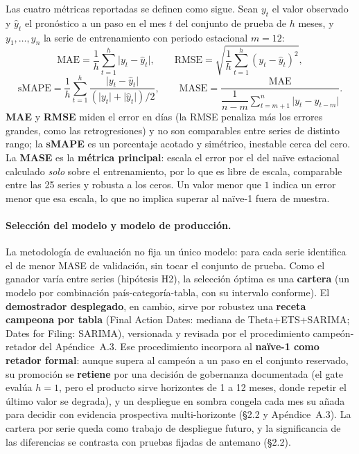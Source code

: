 \documentclass[12pt,letterpaper]{report}
\begin{document}
Las cuatro métricas reportadas se definen como sigue. Sean $y_t$ el valor observado y
$\hat{y}_t$ el pronóstico a un paso en el mes $t$ del conjunto de prueba de $h$ meses, y
$y_1,\dots,y_n$ la serie de entrenamiento con periodo estacional $m=12$:
\begin{equation}
\mathrm{MAE} = \frac{1}{h}\sum_{t=1}^{h} \lvert y_t-\hat{y}_t\rvert,
\qquad
\mathrm{RMSE} = \sqrt{\frac{1}{h}\sum_{t=1}^{h}\left(y_t-\hat{y}_t\right)^2},
\end{equation}
\begin{equation}
\mathrm{sMAPE} = \frac{1}{h}\sum_{t=1}^{h}
\frac{\lvert y_t-\hat{y}_t\rvert}{\left(\lvert y_t\rvert+\lvert \hat{y}_t\rvert\right)/2},
\qquad
\mathrm{MASE} = \frac{\mathrm{MAE}}
{\dfrac{1}{n-m}\displaystyle\sum_{t=m+1}^{n} \lvert y_t - y_{t-m}\rvert}.
\end{equation}
\textbf{MAE} y \textbf{RMSE} miden el error en días (la RMSE penaliza más los errores grandes,
como las retrogresiones) y no son comparables entre series de distinto rango; la \textbf{sMAPE}
es un porcentaje acotado y simétrico, inestable cerca del cero. La \textbf{MASE} es la
\textbf{métrica principal}: escala el error por el del naïve estacional calculado \textit{solo}
sobre el entrenamiento, por lo que es libre de escala, comparable entre las 25 series y robusta
a los ceros. Un valor menor que $1$ indica un error menor que esa escala, lo que no implica
superar al naïve-1 fuera de muestra.

\paragraph{Selección del modelo y modelo de producción.} La metodología de evaluación no
fija un único modelo: para cada serie identifica el de menor MASE de validación, sin tocar el
conjunto de prueba. Como el ganador varía entre series (hipótesis H2), la selección óptima es
una \textbf{cartera} (un modelo por combinación país-categoría-tabla, con su intervalo
conforme). El \textbf{demostrador desplegado}, en cambio, sirve por robustez una \textbf{receta
campeona por tabla} (Final Action Dates: mediana de Theta+ETS+SARIMA; Dates for Filing:
SARIMA), versionada y revisada por el procedimiento campeón-retador del Apéndice~A.3. Ese
procedimiento incorpora al \textbf{naïve-1 como retador formal}: aunque supera al campeón a un
paso en el conjunto reservado, su promoción se \textbf{retiene} por una decisión de gobernanza
documentada (el gate evalúa $h=1$, pero el producto sirve horizontes de 1 a 12 meses, donde
repetir el último valor se degrada), y un despliegue en sombra congela cada mes su añada para
decidir con evidencia prospectiva multi-horizonte (§2.2 y Apéndice~A.3). La cartera por serie
queda como trabajo de despliegue futuro, y la significancia de las diferencias se contrasta con
pruebas fijadas de antemano (§2.2).
\end{document}
